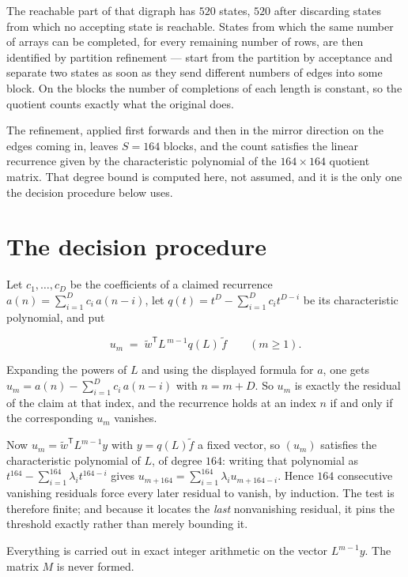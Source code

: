 \documentclass[11pt]{article}
\theoremstyle{definition}
\begin{document}
The reachable part of that digraph has $520$ states, $520$ after discarding states from which no accepting state is reachable. States from which the same number of arrays can be completed, for every remaining number of rows, are then identified by partition refinement --- start from the partition by acceptance and separate two states as soon as they send different numbers of edges into some block. On the blocks the number of completions of each length is constant, so the quotient counts exactly what the original does.

The refinement, applied first forwards and then in the mirror direction on the edges coming in, leaves $S = 164$ blocks, and the count satisfies the linear recurrence given by the characteristic polynomial of the $164 \times 164$ quotient matrix. That degree bound is computed here, not assumed, and it is the only one the decision procedure below uses.

\section{The decision procedure}

Let $c_1,\dots,c_D$ be the coefficients of a claimed recurrence $a(n) = \sum_{i=1}^{D} c_i\,a(n-i)$, let $q(t) = t^{D} - \sum_{i=1}^{D} c_i t^{D-i}$ be its characteristic polynomial, and put

\[u_m \;=\; \tilde w^{\mathsf T} L^{\,m-1} q(L)\,\tilde f \qquad (m \ge 1).\]

Expanding the powers of $L$ and using the displayed formula for $a$, one gets $u_m = a(n) - \sum_{i=1}^{D} c_i\,a(n-i)$ with $n = m + D$. So $u_m$ is exactly the residual of the claim at that index, and the recurrence holds at an index $n$ if and only if the corresponding $u_m$ vanishes.

Now $u_m = \tilde w^{\mathsf T} L^{m-1} y$ with $y = q(L)\tilde f$ a fixed vector, so $(u_m)$ satisfies the characteristic polynomial of $L$, of degree $164$: writing that polynomial as $t^{164} - \sum_{i=1}^{164} \lambda_i t^{164-i}$ gives $u_{m+164} = \sum_{i=1}^{164} \lambda_i u_{m+164-i}$. Hence $164$ consecutive vanishing residuals force every later residual to vanish, by induction. The test is therefore finite; and because it locates the {\itshape last} nonvanishing residual, it pins the threshold exactly rather than merely bounding it.

Everything is carried out in exact integer arithmetic on the vector $L^{m-1}y$. The matrix $M$ is never formed.
\end{document}
